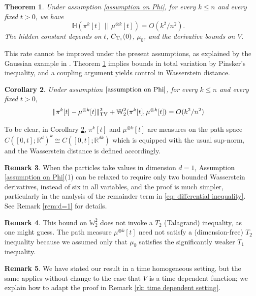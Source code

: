 \documentclass[11pt,reqno]{amsart}
\numberwithin{equation}{section}
\newtheorem{theorem}{Theorem}[section]
\newtheorem{corollary}[theorem]{Corollary}
\theoremstyle{definition}
\newtheorem{remark}[theorem]{Remark}
\def\R{{\mathbb R}}
\newcommand{\W}{\mathbb W}
\newcommand{\ent}{ \mathbb H}
\begin{document}
\begin{theorem}
\label{th: short time}
    Under assumption \ref{assumption on Phi}, for every $k\leq n$ and every fixed $t>0$, we have
    \begin{equation}
        \ent(\pi^k[t]\,\|\,\mu^{\otimes k}[t]) = O(k^2/n^2).
    \end{equation}
 The hidden constant depends on $t$, $C_{\textup{T}_1}(0)$, $\mu_0$, and the derivative bounds on $ V$.
\end{theorem}
This rate cannot be improved under the present assumptions, as explained by the Gaussian example in \cite{HierarchiesPaper}. 
Theorem \ref{th: short time} implies bounds in total variation by Pinsker's inequality, and a coupling argument yields control in Wasserstein distance. 
\begin{corollary}
\label{cr: metric convergences short time}
    Under assumption $\ref{assumption on Phi}$, for every $k\leq n $ and every fixed $t>0$,
    \[\|\pi^k[t]-\mu^{\otimes k}[t]\|^2_{\textup{TV}}+\W_{2}^2(\pi^k[t],\mu^{\otimes k}[t]) =O(k^2/n^2)\]    
\end{corollary}
To be clear, in Corollary \ref{cr: metric convergences short time}, $\pi^k[t]$ and $\mu^{\otimes k}[t]$ are measures on the path space $C([0,t];\R^d)^k \cong C([0,t];\R^{dk})$ which is equipped with the usual sup-norm, and the Wasserstein distance is defined accordingly.

\begin{remark}
When the particles take values in dimension  $d=1$, Assumption \ref{assumption on Phi}(1) can be relaxed to require only two bounded Wasserstein derivatives, instead of six in all variables, and the proof is much simpler, particularly in the analysis of the remainder term in \eqref{eq: differential inequality}. See Remark \ref{rem:d=1} for details.
\end{remark}

\begin{remark}
This bound on $\W_{2}^2$ does not invoke a $T_2$ (Talagrand) inequality, as one might guess. The path measure $\mu^{\otimes k}[t]$ need not satisfy a (dimension-free) $T_2$ inequality because we assumed only that $\mu_0$ satisfies the significantly weaker $T_1$ inequality.
\end{remark}

\begin{remark} \label{rk: time dependent setting-intro}
We have stated our result in a time homogeneous setting, but the same applies without change to the case that $ V$ is a time dependent function; we explain how to adapt the proof in Remark \ref{rk: time dependent setting}.    
\end{remark}
\end{document}
